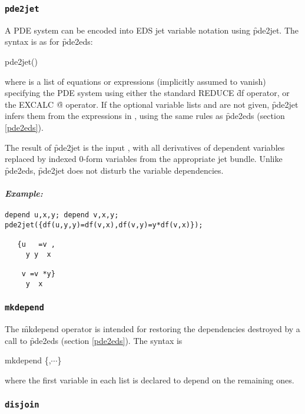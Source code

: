 \subsubsection{\tt pde2jet}
\label{pde2jet}

A PDE system can be encoded into EDS jet variable notation using
\f{pde2jet}. The syntax is as for \f{pde2eds}:
\begin{edssyntax}
	pde2jet()
\end{edssyntax}
where  is a list of equations or expressions (implicitly assumed
to vanish) specifying the PDE system using either the standard REDUCE
\f{df} operator, or the EXCALC \f{@} operator. If the optional variable
lists  and  are not given, \f{pde2jet}
infers them from the expressions in , using the same rules as
\f{pde2eds} (section \ref{pde2eds}).

The result of \f{pde2jet} is the input , with all derivatives
of dependent variables replaced by indexed 0-form variables from the
appropriate jet bundle. Unlike \f{pde2eds}, \f{pde2jet} does not disturb
the variable dependencies.

\paragraph{\it Example:}
\begin{verbatim}
depend u,x,y; depend v,x,y;
pde2jet({df(u,y,y)=df(v,x),df(v,y)=y*df(v,x)});

   {u   =v ,
     y y  x

    v =v *y}
     y  x
\end{verbatim}


\subsubsection{\tt mkdepend}
\label{mkdepend}

The \f{mkdepend} operator is intended for restoring the dependencies
destroyed by a call to \f{pde2eds} (section \ref{pde2eds}). The syntax is
\begin{edssyntax}
	mkdepend \{,$\cdots$\}
\end{edssyntax}
where the first variable in each list is declared to depend on the
remaining ones.


\subsubsection{\tt disjoin}
\label{disjoin}

